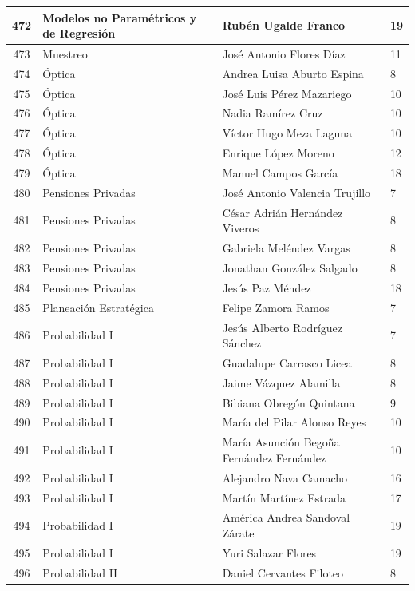 {\begin{longtable}{|c|p{6.5cm}|p{5cm}|p{1.5cm}|}
  472 & Modelos no Paramétricos y de Regresión & Rubén Ugalde Franco & 19 \\ \hline 
  473 & Muestreo & José Antonio Flores Díaz & 11 \\ \hline 
  474 & Óptica & Andrea Luisa Aburto Espina & 8 \\ \hline 
  475 & Óptica & José Luis Pérez Mazariego & 10 \\ \hline 
  476 & Óptica & Nadia Ramírez Cruz & 10 \\ \hline 
  477 & Óptica & Víctor Hugo Meza Laguna & 10 \\ \hline 
  478 & Óptica & Enrique López Moreno & 12 \\ \hline 
  479 & Óptica & Manuel Campos García & 18 \\ \hline 
  480 & Pensiones Privadas & José Antonio Valencia Trujillo & 7 \\ \hline 
  481 & Pensiones Privadas & César Adrián Hernández Viveros & 8 \\ \hline 
  482 & Pensiones Privadas & Gabriela Meléndez Vargas & 8 \\ \hline 
  483 & Pensiones Privadas & Jonathan González Salgado & 8 \\ \hline 
  484 & Pensiones Privadas & Jesús Paz Méndez & 18 \\ \hline 
  485 & Planeación Estratégica & Felipe Zamora Ramos & 7 \\ \hline 
  486 & Probabilidad I & Jesús Alberto Rodríguez Sánchez & 7 \\ \hline 
  487 & Probabilidad I & Guadalupe Carrasco Licea & 8 \\ \hline 
  488 & Probabilidad I & Jaime Vázquez Alamilla & 8 \\ \hline 
  489 & Probabilidad I & Bibiana Obregón Quintana & 9 \\ \hline 
  490 & Probabilidad I & María del Pilar Alonso Reyes & 10 \\ \hline 
  491 & Probabilidad I & María Asunción Begoña Fernández Fernández & 10 \\ \hline 
  492 & Probabilidad I & Alejandro Nava Camacho & 16 \\ \hline 
  493 & Probabilidad I & Martín Martínez Estrada & 17 \\ \hline 
  494 & Probabilidad I & América Andrea Sandoval Zárate & 19 \\ \hline 
  495 & Probabilidad I & Yuri Salazar Flores & 19 \\ \hline 
  496 & Probabilidad II & Daniel Cervantes Filoteo & 8 \\ \hline 

\end{longtable}}
